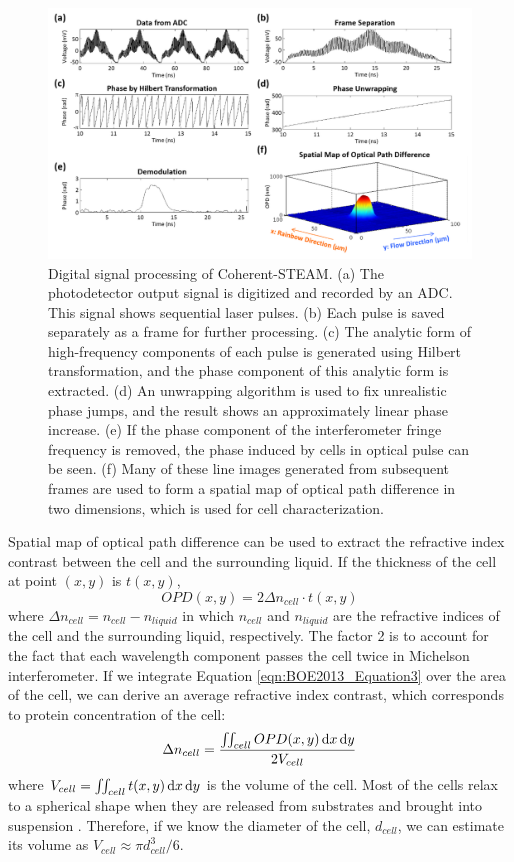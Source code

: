 \begin{figure}[htb!]
\centering
\includegraphics[scale=0.75]{BOE2013/Figure2.png}
\caption{Digital signal processing of Coherent-STEAM. (a) The photodetector output signal is digitized and recorded by an ADC. This signal shows sequential laser pulses. (b) Each pulse is saved separately as a frame for further processing. (c) The analytic form of high-frequency components of each pulse is generated using Hilbert transformation, and the phase component of this analytic form is extracted. (d) An unwrapping algorithm is used to fix unrealistic phase jumps, and the result shows an approximately linear phase increase. (e) If the phase component of the interferometer fringe frequency is removed, the phase induced by cells in optical pulse can be seen. (f) Many of these line images generated from subsequent frames are used to form a spatial map of optical path difference in two dimensions, which is used for cell characterization.}
\label{fig:BOE2013_Figure2}
\end{figure}

Spatial map of optical path difference can be used to extract the refractive index contrast between the cell and the surrounding liquid.  If the thickness of the cell at point $(x,y)$ is $t(x,y)$,
\begin{equation}
OPD(x,y) = 2 \Delta n_{cell} \cdot t(x,y)
\label{eqn:BOE2013_Equation3}
\end{equation}
where $\Delta n_{cell} = n_{cell} - n_{liquid}$ in which $n_{cell}$ and $n_{liquid}$ are the refractive indices of the cell and the surrounding liquid, respectively. The factor 2 is to account for the fact that each wavelength component passes the cell twice in Michelson interferometer. If we integrate Equation \eqref{eqn:BOE2013_Equation3} over the area of the cell, we can derive an average refractive index contrast, which corresponds to protein concentration of the cell:
\begin{equation}
\Delta n_{cell} = \frac{\iint_{cell} OPD(x,y) \,\mathrm{d} x \,\mathrm{d} y}{2V_{cell}}
\label{eqn:BOE2013_Equation4}
\end{equation}
where $V_{cell} = \iint_{cell} t(x,y) \,\mathrm{d} x \,\mathrm{d} y$ is the volume of the cell. Most of the cells relax to a spherical shape when they are released from substrates and brought into suspension \cite{revel1974adhesion,whur1977substrate}. Therefore, if we know the diameter of the cell, $d_{cell}$, we can estimate its volume as $V_{cell} \approx \pi d_{cell}^3/6$.

